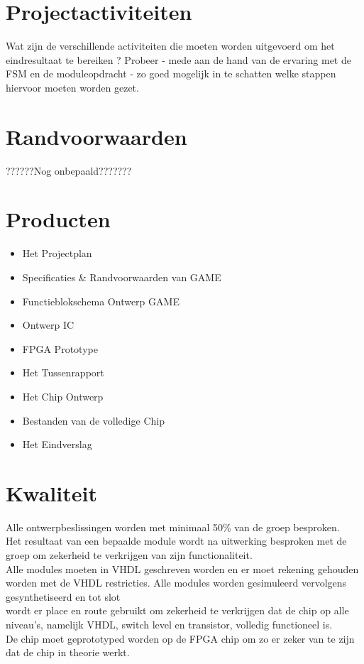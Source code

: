 \documentclass[11pt,twoside,a4paper]{article}
\begin{document}
\section{Projectactiviteiten}


Wat zijn de verschillende activiteiten die moeten worden uitgevoerd om het eindresultaat te bereiken ?   Probeer - mede aan de hand van de ervaring met de FSM en de moduleopdracht - zo goed mogelijk in te schatten welke stappen hiervoor moeten worden gezet.
\section{Randvoorwaarden}
??????Nog onbepaald???????

\section{Producten}
\begin{itemize}
\item Het Projectplan
\item Specificaties \& Randvoorwaarden van GAME
\item Functieblokschema Ontwerp GAME
\item Ontwerp IC
\item FPGA Prototype
\item Het Tussenrapport
\item Het Chip Ontwerp
\item Bestanden van de volledige Chip
\item Het Eindverslag
\end {itemize}

\section{Kwaliteit}
Alle ontwerpbeslissingen worden met minimaal 50\% van de groep besproken.
\\Het resultaat van een bepaalde module wordt na uitwerking besproken met de groep om zekerheid te verkrijgen van zijn functionaliteit.
\\Alle modules moeten in VHDL geschreven worden en er moet rekening gehouden worden met de VHDL restricties. Alle modules worden gesimuleerd vervolgens gesynthetiseerd en tot slot \\wordt er place en route gebruikt om zekerheid te verkrijgen dat de chip op alle niveau's, namelijk VHDL, switch level en transistor, volledig functioneel is.
\\De chip moet geprototyped worden op de FPGA chip om zo er zeker van te zijn dat de chip in theorie werkt.
\end{document}

